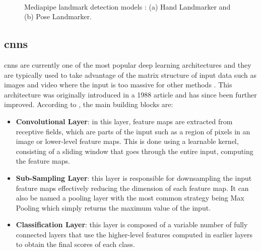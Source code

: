 \begin{figure}[ht]
    \centering
    \begin{subfigure}[b]{0.49\textwidth}
        \caption{}
        \label{fig:mediapipe_hand_landmarks}
    \end{subfigure} \
    \begin{subfigure}[b]{0.49\textwidth}
        \caption{}
        \label{fig:mediapipe_pose_landmarks}
    \end{subfigure}
    \caption[Mediapipe landmark detection models: Hand Landmarker and Pose Landmarker.]{Mediapipe landmark detection models \cite{mediapipe_docs}: (a) Hand Landmarker and (b) Pose Landmarker.}
    \label{fig:mediapipe_landmarks}
\end{figure}

\subsection{\acfp{cnn}}

\acfp{cnn} are currently one of the most popular deep learning architectures and they are typically used to take advantage of the matrix structure of input data such as images and video where the input is too massive for other methods \cite{Sarker2021}. This architecture was originally introduced in a 1988 article \cite{Fukushima1988} and has since been further improved. According to \textcite{Alom2019}, the main building blocks are:
\begin{itemize}
    \item \textbf{Convolutional Layer}: in this layer, feature maps are extracted from receptive fields, which are parts of the input such as a region of pixels in an image or lower-level feature maps. This is done using a learnable kernel, consisting of a sliding window that goes through the entire input, computing the feature maps.

    \item \textbf{Sub-Sampling Layer}: this layer is responsible for downsampling the input feature maps effectively reducing the dimension of each feature map. It can also be named a pooling layer with the most common strategy being Max Pooling which simply returns the maximum value of the input.

    \item \textbf{Classification Layer}: this layer is composed of a variable number of fully connected layers that use the higher-level features computed in earlier layers to obtain the final scores of each class.
\end{itemize}

